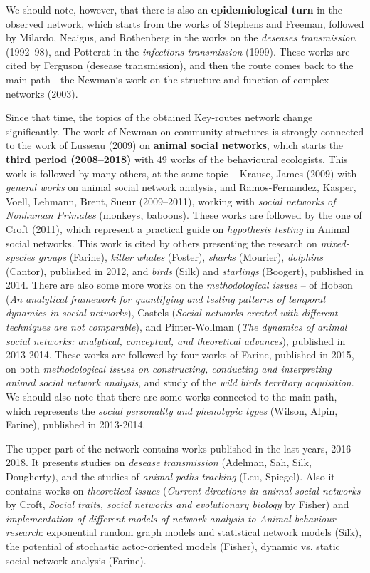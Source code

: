 \documentclass[11pt]{article} %
\begin{document}
We should note, however, that there is also an \textbf{epidemiological turn} in the observed network, which starts from the works of Stephens and Freeman, followed by Milardo, Neaigus, and Rothenberg in the works on the \textit{deseases transmission} (1992--98), and Potterat in the \textit{infections transmission} (1999). These works are cited by Ferguson (desease transmission), and then the route comes back to the main path - the Newman`s work on the structure and function of complex networks (2003). \medskip 

 Since that time, the topics of the obtained Key-routes network change significantly. The work of Newman on community stractures is strongly connected to the work of Lusseau (2009) on \textbf{animal social networks}, which starts the \textbf{third period (2008--2018)} with 49 works of the behavioural ecologists. This work is followed by many others, at the same topic -- Krause, James (2009) with \textit{general works} on animal social network analysis, and Ramos-Fernandez, Kasper, Voell, Lehmann, Brent, Sueur (2009--2011), working with \textit{social networks of Nonhuman Primates} (monkeys, baboons). These works are followed by the one of Croft (2011), which represent a practical guide on \textit{hypothesis testing} in Animal social networks. This work is cited by others presenting the research on \textit{mixed-species groups} (Farine), \textit{killer whales} (Foster), \textit{sharks} (Mourier), \textit{dolphins} (Cantor), published in 2012, and \textit{birds} (Silk) and \textit{starlings} (Boogert), published in 2014. There are also some more works on the \textit{methodological issues} -- of Hobson (\textit{An analytical framework for quantifying and testing patterns of temporal dynamics in social networks}), Castels (\textit{Social networks created with different techniques are not comparable}), and Pinter-Wollman (\textit{The dynamics of animal social networks: analytical, conceptual, and theoretical advances}), published in 2013-2014. These works are followed by four works of Farine, published in 2015, on both \textit{methodological issues on constructing, conducting and interpreting animal social network analysis}, and study of the \textit{wild birds territory acquisition}. We should also note that there are some works connected to the main path, which represents the \textit{social personality and phenotypic types} (Wilson, Alpin, Farine), published in 2013-2014.\medskip   
 
The upper part of the network contains works published in the last years, 2016--2018. It presents studies on \textit{desease transmission} (Adelman, Sah, Silk, Dougherty), and the studies of \textit{animal paths tracking} (Leu, Spiegel). Also it contains works on \textit{theoretical issues} (\textit{Current directions in animal social networks} by Croft, \textit{Social traits, social networks and evolutionary biology} by Fisher) and \textit{implementation of different models of network analysis to Animal behaviour research}:  exponential random graph models and statistical network models (Silk), the potential of stochastic actor-oriented models (Fisher),  dynamic vs. static social network analysis (Farine). \medskip   
\end{document}
